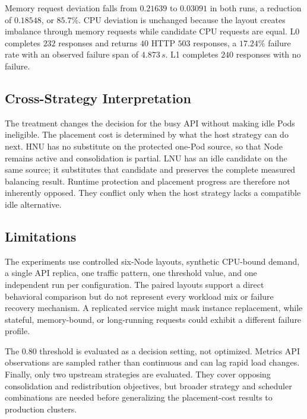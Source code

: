 Memory request deviation falls from \(0.21639\) to \(0.03091\) in both runs,
a reduction of \(0.18548\), or \(85.7\%\). CPU deviation is unchanged because
the layout creates imbalance through memory requests while candidate CPU
requests are equal. L0 completes \(232\) responses and returns \(40\) HTTP
\(503\) responses, a \(17.24\%\) failure rate with an observed failure span of
\(4.873\,s\). L1 completes \(240\) responses with no failure.

\subsection{Cross-Strategy Interpretation}

The treatment changes the decision for the busy API without making idle Pods
ineligible. The placement cost is determined by what the host strategy can do
next. HNU has no substitute on the protected one-Pod source, so that Node
remains active and consolidation is partial. LNU has an idle candidate on the
same source; it substitutes that candidate and preserves the complete measured
balancing result. Runtime protection and placement progress are therefore not
inherently opposed. They conflict only when the host strategy lacks a
compatible idle alternative.

\subsection{Limitations}

The experiments use controlled six-Node layouts, synthetic CPU-bound demand,
a single API replica, one traffic pattern, one threshold value, and one
independent run per configuration. The paired layouts support a direct
behavioral comparison but do not represent every workload mix or failure
recovery mechanism. A replicated service might mask instance replacement,
while stateful, memory-bound, or long-running requests could exhibit a
different failure profile.

The \(0.80\) threshold is evaluated as a decision setting, not optimized.
Metrics API observations are sampled rather than continuous and can lag rapid
load changes. Finally, only two upstream strategies are evaluated. They cover
opposing consolidation and redistribution objectives, but broader strategy
and scheduler combinations are needed before generalizing the placement-cost
results to production clusters.

\clearpage
